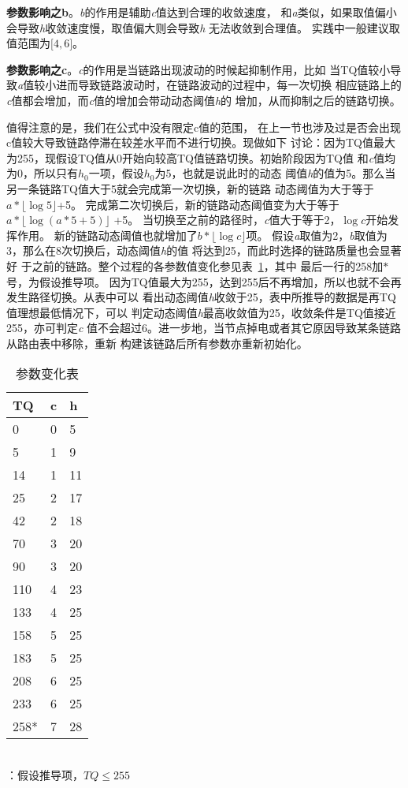 \textbf{参数影响之b}。\emph{b}的作用是辅助\emph{c}值达到合理的收敛速度，
和\emph{a}类似，如果取值偏小会导致\emph{h}收敛速度慢，取值偏大则会导致\emph{h}
无法收敛到合理值。
实践中一般建议取值范围为$\lbrack4,6\rbrack$。


\textbf{参数影响之c}。\emph{c}的作用是当链路出现波动的时候起抑制作用，比如
当TQ值较小导致\emph{a}值较小进而导致链路波动时，在链路波动的过程中，每一次切换
相应链路上的\emph{c}值都会增加，而\emph{c}值的增加会带动动态阈值\emph{h}的
增加，从而抑制之后的链路切换。

值得注意的是，我们在公式中没有限定c值的范围，
在上一节也涉及过是否会出现c值较大导致链路停滞在较差水平而不进行切换。现做如下
讨论：因为TQ值最大为255，现假设TQ值从0开始向较高TQ值链路切换。初始阶段因为TQ值
和\emph{c}值均为0，所以只有$h_{0}$一项，假设$h_{0}$为5，也就是说此时的动态
阈值\emph{h}的值为5。那么当另一条链路TQ值大于5就会完成第一次切换，新的链路
动态阈值为大于等于$a*\lfloor \log 5 \rfloor$+5。
完成第二次切换后，新的链路动态阈值变为大于等于
$a*\lfloor \log(a*5+5) \rfloor$ +5。
当切换至之前的路径时，\emph{c}值大于等于2，$\log c$开始发挥作用。
新的链路动态阈值也就增加了$b*\lfloor \log c \rfloor$项。
假设\emph{a}取值为2，\emph{b}取值为3，那么在8次切换后，动态阈值\emph{h}的值
将达到25，而此时选择的链路质量也会显著好
于之前的链路。整个过程的各参数值变化参见表~\ref{tab:parameter_change}，其中
最后一行的258加$*$号，为假设推导项。
因为TQ值最大为255，达到255后不再增加，所以也就不会再发生路径切换。从表中可以
看出动态阈值\emph{h}收敛于25，表中所推导的数据是再TQ值理想最低情况下，可以
判定动态阈值\emph{h}最高收敛值为25，收敛条件是TQ值接近255，亦可判定\emph{c}
值不会超过6。进一步地，当节点掉电或者其它原因导致某条链路从路由表中移除，重新
构建该链路后所有参数亦重新初始化。

\begin{table}[htbp]
  \centering
  \caption{参数变化表}
  \label{tab:parameter_change}
  \begin{minipage}[t]{0.4\textwidth}
  \begin{tabular}{p{2cm}p{2cm}p{0.5cm}}
  \hline
  TQ & c & h\\
  \hline
  0 & 0 & 5 \\
  5 & 1 & 9 \\
  14 & 1 & 11 \\
  25 & 2 & 17 \\
  42 & 2 & 18 \\
  70 & 3 & 20 \\
  90 & 3 & 20 \\
  110 & 4 & 23 \\
  133 & 4 & 25 \\
  158 & 5 & 25 \\
  183 & 5 & 25 \\
  208 & 6 & 25 \\
  233 & 6 & 25 \\
  258* & 7 & 28 \\
  \hline
  \end{tabular}\\
  \footnotesize *：假设推导项，$TQ \le 255$\\
  \end{minipage}
\end{table}

